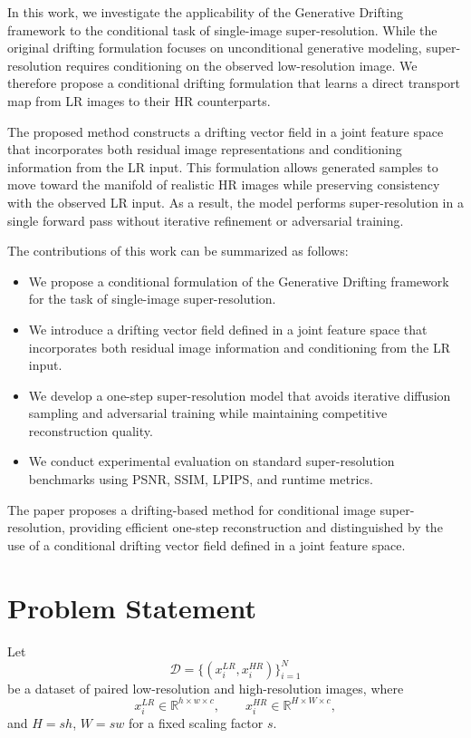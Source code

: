 \documentclass{article}
\begin{document}
In this work, we investigate the applicability of the Generative Drifting framework to the conditional task of single-image super-resolution. 
While the original drifting formulation focuses on unconditional generative modeling, super-resolution requires conditioning on the observed low-resolution image. 
We therefore propose a conditional drifting formulation that learns a direct transport map from LR images to their HR counterparts.

The proposed method constructs a drifting vector field in a joint feature space that incorporates both residual image representations and conditioning information from the LR input. 
This formulation allows generated samples to move toward the manifold of realistic HR images while preserving consistency with the observed LR input. 
As a result, the model performs super-resolution in a single forward pass without iterative refinement or adversarial training.

The contributions of this work can be summarized as follows:

\begin{itemize}
\item We propose a conditional formulation of the Generative Drifting framework for the task of single-image super-resolution.
\item We introduce a drifting vector field defined in a joint feature space that incorporates both residual image information and conditioning from the LR input.
\item We develop a one-step super-resolution model that avoids iterative diffusion sampling and adversarial training while maintaining competitive reconstruction quality.
\item We conduct experimental evaluation on standard super-resolution benchmarks using PSNR, SSIM, LPIPS, and runtime metrics.
\end{itemize}

The paper proposes a drifting-based method for conditional image super-resolution, providing efficient one-step reconstruction and distinguished by the use of a conditional drifting vector field defined in a joint feature space.
\section{Problem Statement}\label{sec:prelim}

Let
\[
\mathcal{D}=\{(x_i^{LR},x_i^{HR})\}_{i=1}^{N}
\]
be a dataset of paired low-resolution and high-resolution images, where
\[
x_i^{LR}\in\mathbb{R}^{h\times w\times c}, \qquad
x_i^{HR}\in\mathbb{R}^{H\times W\times c},
\]
and $H=sh$, $W=sw$ for a fixed scaling factor $s$.
\end{document}
